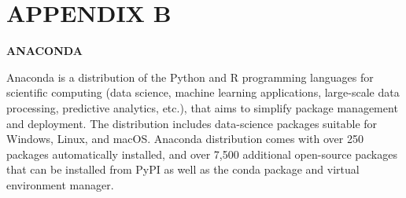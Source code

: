 \documentclass[12pt, a4paper]{report}
\begin{document}
\chapter*{APPENDIX B}
 \item \textbf{ANACONDA}
\item\justify  Anaconda is a distribution of the Python and R programming languages for scientific computing (data science, machine learning applications, large-scale data processing, predictive analytics, etc.), that aims to simplify package management and deployment. The distribution includes data-science packages suitable for Windows, Linux, and macOS. Anaconda distribution comes with over 250 packages automatically installed, and over 7,500 additional open-source packages that can be installed from PyPI as well as the conda package and virtual environment manager.
\end{document}
